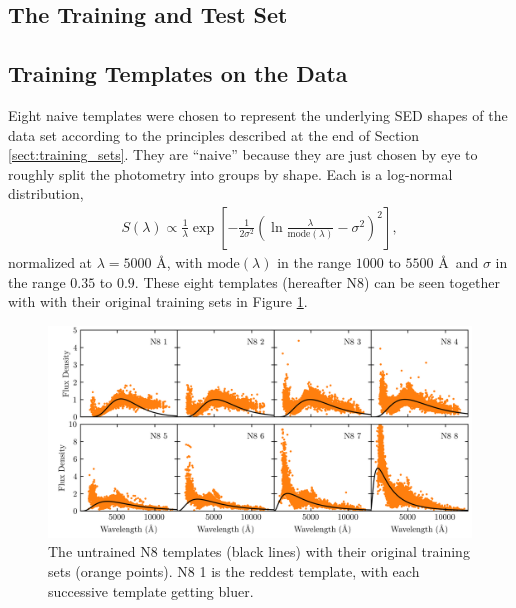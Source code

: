 
\label{sect:application}





\subsection{The Training and Test Set}





\subsection{Training Templates on the Data}

Eight naive templates were chosen to represent the underlying SED shapes of the data set according to the principles described at the end of Section \ref{sect:training_sets}. 
They are ``naive'' because they are just chosen by eye to roughly split the photometry into groups by shape. 
Each is a log-normal distribution,
\begin{align}
    S(\lambda) \propto \frac{1}{\lambda} \exp{\left[ -\frac{1}{2\sigma^2} \left( \ln{\frac{\lambda}{\text{mode}(\lambda)}}-\sigma^2 \right)^2 \right]},
\end{align}
normalized at $\lambda = 5000$ \AA, with $\text{mode}(\lambda)$ in the range $1000$ to $5500$ \AA\  and $\sigma$ in the range $0.35$ to $0.9$. 
These eight templates (hereafter N8) can be seen together with with their original training sets in Figure \ref{fig:N8_untrained}.

\begin{figure}
    \centering
    \includegraphics{figures/N8_untrained.png}
    \caption{The untrained N8 templates (black lines) with their original training sets (orange points). N8 1 is the reddest template, with each successive template getting bluer.}
    \label{fig:N8_untrained}
\end{figure}

